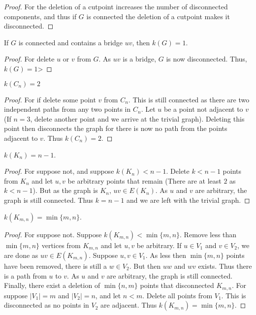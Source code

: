 \documentclass[crop=false,class=book,oneside]{standalone}
\begin{document}
\begin{proof}
For the deletion of a cutpoint increases the number of disconnected components, and thus if $G$ is connected the deletion of a cutpoint makes it disconnected.
\end{proof}
\begin{corollary}
If $G$ is connected and contains a bridge $uv$, then $k(G)=1$.
\end{corollary}
\begin{proof}
For delete $u$ or $v$ from $G$. As $uv$ is a bridge, $G$ is now disconnected. Thus, $k(G) = 1$>
\end{proof}
\begin{corollary}
$k(C_n) =2$
\end{corollary}
\begin{proof}
For if delete some point $v$ from $C_n$. This is still connected as there are two independent paths from any two points in $C_n$. Let $u$ be a point not adjacent to $v$ (If $n=3$, delete another point and we arrive at the trivial graph). Deleting this point then disconnects the graph for there is now no path from the points adjacent to $v$. Thus $k(C_n)=2$.
\end{proof}
\begin{corollary}
$k(K_n) = n-1$.
\end{corollary}
\begin{proof}
For suppose not, and suppose $k(K_n)<n-1$. Delete $k<n-1$ points from $K_n$ and let $u,v$ be arbitrary points that remain (There are at least $2$ as $k<n-1$). But as the graph is $K_n$, $uv\in E(K_n)$. As $u$ and $v$ are arbitrary, the graph is still connected. Thus $k=n-1$ and we are left with the trivial graph.
\end{proof}
\begin{corollary}
$k(K_{m,n}) = \min\{m,n\}$.
\end{corollary}
\begin{proof}
For suppose not. Suppose $k(K_{m,n})<\min\{m,n\}$. Remove less than $\min\{m,n\}$ vertices from $K_{m,n}$ and let $u,v$ be arbitrary. If $u\in V_1$ and $v\in V_2$, we are done as $uv\in E(K_{m,n})$. Suppose $u,v\in V_1$. As less then $\min\{m,n\}$ points have been removed, there is still a $w\in V_2$. But then $uw$ and $wv$ exists. Thus there is a path from $u$ to $v$. As $u$ and $v$ are arbitrary, the graph is still connected. Finally, there exist a deletion of $\min\{n,m\}$ points that disconnected $K_{m,n}$. For suppose $|V_1| = m$ and $|V_2| = n$, and let $n<m$. Delete all points from $V_1$. This is disconnected as no points in $V_2$ are adjacent. Thus $k(K_{m,n})=\min\{m,n\}$.
\end{proof}
\end{document}
